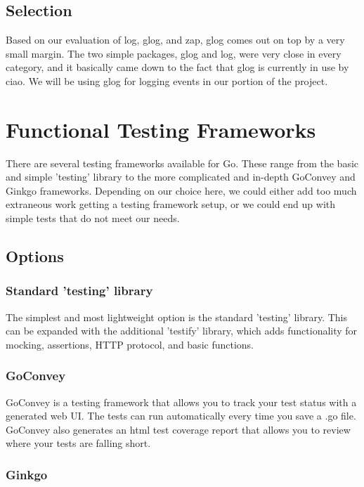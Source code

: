 \documentclass[10pt,letterpaper,onecolumn,draftclsnofoot]{IEEEtran}
\begin{document}
\subsection{Selection}

Based on our evaluation of log, glog, and zap, glog comes out on top by a very
small margin. The two simple packages, glog and log, were very close in every
category, and it basically came down to the fact that glog is currently in use
by ciao. We will be using glog for logging events in our portion of the project.

\section{Functional Testing Frameworks}

There are several testing frameworks available for Go. These range from the
basic and simple 'testing' library to the more complicated and in-depth GoConvey
and Ginkgo frameworks. Depending on our choice here, we could either add too
much extraneous work getting a testing framework setup, or we could end up with
simple tests that do not meet our needs.

\subsection{Options}

\subsubsection{Standard 'testing' library}

The simplest and most lightweight option is the standard 'testing' library. This
can be expanded with the additional 'testify' library, which adds functionality
for mocking, assertions, HTTP protocol, and basic functions.

\subsubsection{GoConvey}

GoConvey is a testing framework that allows you to track your test status with a
generated web UI. The tests can run automatically every time you save a .go
file. GoConvey also generates an html test coverage report that allows you to
review where your tests are falling short.

\subsubsection{Ginkgo}
\end{document}
